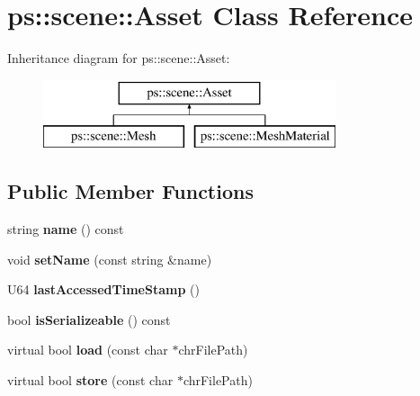 \hypertarget{classps_1_1scene_1_1Asset}{}\section{ps\+:\+:scene\+:\+:Asset Class Reference}
\label{classps_1_1scene_1_1Asset}
Inheritance diagram for ps\+:\+:scene\+:\+:Asset\+:\begin{figure}[H]
\begin{center}
\leavevmode
\includegraphics[height=2.000000cm]{classps_1_1scene_1_1Asset}
\end{center}
\end{figure}
\subsection*{Public Member Functions}
\begin{DoxyCompactItemize}
\item 
\hypertarget{classps_1_1scene_1_1Asset_a3cefe1397cff706fdd7f9f4a44974188}{}string {\bfseries name} () const \label{classps_1_1scene_1_1Asset_a3cefe1397cff706fdd7f9f4a44974188}

\item 
\hypertarget{classps_1_1scene_1_1Asset_ad7a73f290bbe2d6fd56e47470903b081}{}void {\bfseries set\+Name} (const string \&name)\label{classps_1_1scene_1_1Asset_ad7a73f290bbe2d6fd56e47470903b081}

\item 
\hypertarget{classps_1_1scene_1_1Asset_a2f61daf9e9cc7d04b949e94e4e9c1a8f}{}U64 {\bfseries last\+Accessed\+Time\+Stamp} ()\label{classps_1_1scene_1_1Asset_a2f61daf9e9cc7d04b949e94e4e9c1a8f}

\item 
\hypertarget{classps_1_1scene_1_1Asset_a348f6ba9e92844dc8abb43ac39069159}{}bool {\bfseries is\+Serializeable} () const \label{classps_1_1scene_1_1Asset_a348f6ba9e92844dc8abb43ac39069159}

\item 
\hypertarget{classps_1_1scene_1_1Asset_a3b2277636f3e92fcedad131ba0949f7d}{}virtual bool {\bfseries load} (const char $\ast$chr\+File\+Path)\label{classps_1_1scene_1_1Asset_a3b2277636f3e92fcedad131ba0949f7d}

\item 
\hypertarget{classps_1_1scene_1_1Asset_a64b74f1fc93c9c62ee0fc4e3060c5953}{}virtual bool {\bfseries store} (const char $\ast$chr\+File\+Path)\label{classps_1_1scene_1_1Asset_a64b74f1fc93c9c62ee0fc4e3060c5953}

\end{DoxyCompactItemize}
